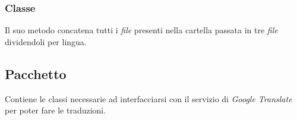 \documentclass[tesi.tex]{subfiles}
\begin{document}
\subsubsection{Classe }
\begin{center}
\end{center}
Il suo metodo  concatena tutti i \emph{file}
presenti nella cartella passata in tre \emph{file} dividendoli per
lingua.







\subsection{Pacchetto }
Contiene le classi necessarie ad interfacciarsi con il servizio di
\emph{Google Translate} per poter fare le traduzioni.
\end{document}
